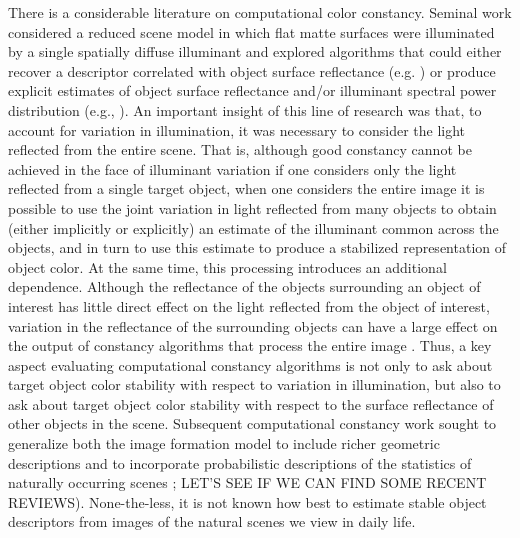 \documentclass{jov}
\begin{document}
There is a considerable literature on computational color constancy. Seminal work considered a reduced scene model in which flat matte surfaces were illuminated by a single spatially diffuse illuminant and explored algorithms that could either recover a descriptor correlated with object surface reflectance (e.g. ) or produce explicit estimates of object surface reflectance and/or illuminant spectral power distribution (e.g., ).
An important insight of this line of research was that, to account for variation in illumination, it was necessary to consider the light reflected from the entire scene. That is, although good constancy cannot be achieved in the face of illuminant variation if one considers only the light reflected from a single target object, when one considers the entire image it is possible to use the joint variation in light reflected from many objects to obtain (either implicitly or explicitly) an estimate of the illuminant common across the objects, and in turn to use this estimate to produce a stabilized representation of object color.
At the same time, this processing introduces an additional dependence.  Although the reflectance of the objects surrounding an object of interest has little direct effect on the light reflected from the object of interest, variation in the reflectance of the surrounding objects can have a large effect on the output of constancy algorithms that process the entire image \cite{BrainardWandellRetinex}.
Thus, a key aspect evaluating computational constancy algorithms is not only to ask about target object color stability with respect to variation in illumination, but also to ask about target object color stability with respect to the surface reflectance of other objects in the scene.
Subsequent computational constancy work sought to generalize both the image formation model to include richer geometric descriptions and to incorporate probabilistic descriptions of the statistics of naturally occurring scenes \cite{funt1988color, D'ZmuraConstancy3, barron2012color, D'ZmuraIversonSinger,BrainardFreeman}; LET'S SEE IF WE CAN FIND SOME RECENT REVIEWS).  None-the-less, it is not known how best to estimate stable object descriptors from images of the natural scenes we view in daily life.
\end{document}
